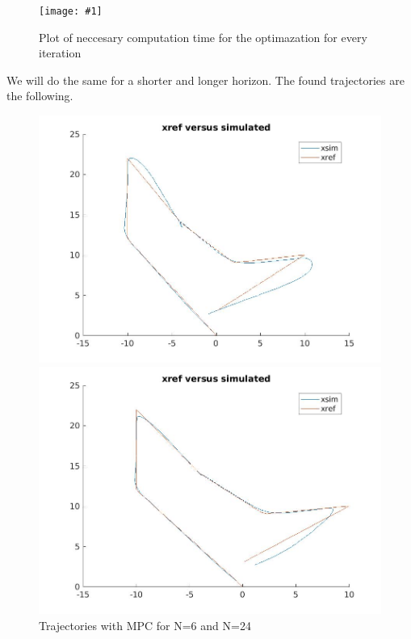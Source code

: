 \documentclass[•]{article}
\newcommand{\apicture}[2] {
  \begin{figure}[H]
  \centering
  \texttt{[image: \#1]}
  \caption{#2}
  \end{figure}
  }
\begin{document}
\apicture{comptime12.jpg}{Plot of neccesary computation time for the optimazation for every iteration}

We will do the same for a shorter and longer horizon. The found trajectories are the following.

\begin{figure}[H]
\begin{minipage}{.45\textwidth}
\includegraphics[width = \textwidth]{mpctraj6.jpg}
\end{minipage}
\begin{minipage}{.45\textwidth}
\includegraphics[width = \textwidth]{mpctraj24.jpg}
\end{minipage}
\caption{Trajectories with MPC for N=6 and N=24}
\end{figure}
\end{document}
